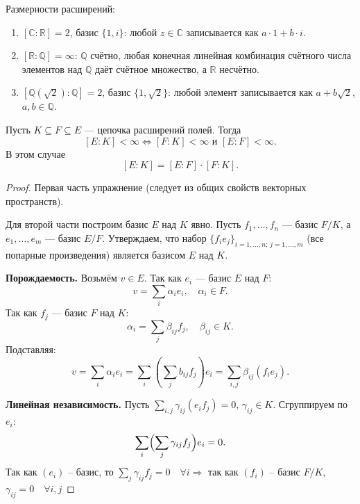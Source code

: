 \begin{example}
    Размерности расширений:
    \begin{enumerate}
        \item $[\mathbb{C} : \mathbb{R}] = 2$, базис $\{1, i\}$: любой $z \in \mathbb{C}$ записывается как
        $a \cdot 1 + b \cdot i$.
        \item $[\mathbb{R} : \mathbb{Q}] = \infty$: $\mathbb{Q}$ счётно, любая конечная линейная комбинация
        счётного числа элементов над $\mathbb{Q}$ даёт счётное множество, а $\mathbb{R}$ несчётно.
        \item $[\mathbb{Q}(\sqrt{2}) : \mathbb{Q}] = 2$, базис $\{1, \sqrt{2}\}$: любой элемент записывается как
        $a + b\sqrt{2}$, $a, b \in \mathbb{Q}$.
    \end{enumerate}
\end{example}

\begin{stmt}
    Пусть $K \subseteq F \subseteq E$ --- цепочка расширений полей. Тогда
    \[
        [E : K] < \infty \iff [F : K] < \infty \text{ и } [E : F] < \infty.
    \]
    В этом случае
    \[
        [E : K] = [E : F] \cdot [F : K].
    \]

    \begin{proof}
        Первая часть упражнение (следует из общих свойств векторных пространств).

        Для второй части построим базис $E$ над $K$ явно.
        Пусть $f_1, \ldots, f_n$ --- базис $F/K$, а $e_1, \ldots, e_m$ --- базис $E/F$.
        Утверждаем, что набор $\{f_i e_j\}_{i=1,\ldots,n;\, j=1,\ldots,m}$ (все попарные произведения)
        является базисом $E$ над $K$.

        \textbf{Порождаемость.} Возьмём $v \in E$. Так как $e_i$ --- базис $E$ над $F$:
        \[
            v = \sum_i \alpha_i e_i, \quad \alpha_i \in F.
        \]
        Так как $f_j$ --- базис $F$ над $K$:
        \[
            \alpha_i = \sum_j \beta_{ij} f_j, \quad \beta_{ij} \in K.
        \]
        Подставляя:
        \[
            v = \sum_i \alpha_i  e_i = \sum_i (\sum_j b_{ij} f_j)e_i = \sum_{i,j} \beta_{ij} (f_i e_j).
        \]

        \textbf{Линейная независимость.} Пусть $\sum_{i,j} \gamma_{ij} (e_i f_j) = 0$, $\gamma_{ij} \in K$.
        Сгруппируем по $e_i$:
        \[
            \sum_i \Bigl(\sum_j \gamma_{ij} f_j\Bigr) e_i = 0.
        \]
        Так как $(e_i)$ -- базис, то $\sum_j \gamma_{ij} f_j = 0 \quad \forall i \Rightarrow$ так как
        $(f_i)$ -- базис $F/K$,
        $\gamma_{ij} = 0 \quad \forall i,j$
    \end{proof}
\end{stmt}

